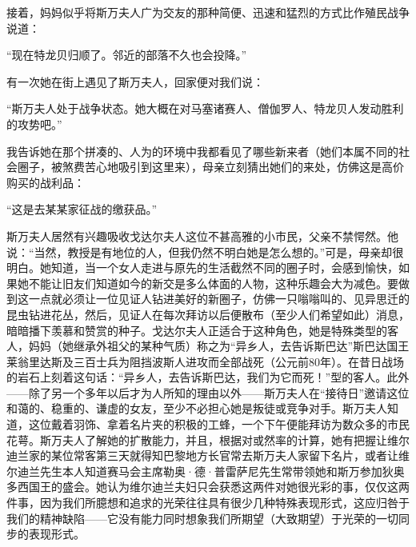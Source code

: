 \par 接着，妈妈似乎将斯万夫人广为交友的那种简便、迅速和猛烈的方式比作殖民战争说道：
\par “现在特龙贝归顺了。邻近的部落不久也会投降。”
\par 有一次她在街上遇见了斯万夫人，回家便对我们说：
\par “斯万夫人处于战争状态。她大概在对马塞诸赛人、僧伽罗人、特龙贝人发动胜利的攻势吧。”
\par 我告诉她在那个拼凑的、人为的环境中我都看见了哪些新来者（她们本属不同的社会圈子，被煞费苦心地吸引到这里来），母亲立刻猜出她们的来处，仿佛这是高价购买的战利品：
\par “这是去某某家征战的缴获品。”
\par 斯万夫人居然有兴趣吸收戈达尔夫人这位不甚高雅的小市民，父亲不禁愕然。他说：“当然，教授是有地位的人，但我仍然不明白她是怎么想的。”可是，母亲却很明白。她知道，当一个女人走进与原先的生活截然不同的圈子时，会感到愉快，如果她不能让旧友们知道如今的新交是多么体面的人物，这种乐趣会大为减色。要做到这一点就必须让一位见证人钻进美好的新圈子，仿佛一只嗡嗡叫的、见异思迁的昆虫钻进花丛，然后，见证人在每次拜访以后便散布（至少人们希望如此）消息，暗暗播下羡慕和赞赏的种子。戈达尔夫人正适合于这种角色，她是特殊类型的客人，妈妈（她继承外祖父的某种气质）称之为“异乡人，去告诉斯巴达”斯巴达国王莱翁里达斯及三百士兵为阻挡波斯人进攻而全部战死（公元前80年）。在昔日战场的岩石上刻着这句话：“异乡人，去告诉斯巴达，我们为它而死！”型的客人。此外——除了另一个多年以后才为人所知的理由以外——斯万夫人在“接待日”邀请这位和蔼的、稳重的、谦虚的女友，至少不必担心她是叛徒或竞争对手。斯万夫人知道，这位戴着羽饰、拿着名片夹的积极的工蜂，一个下午便能拜访为数众多的市民花萼。斯万夫人了解她的扩散能力，并且，根据对或然率的计算，她有把握让维尔迪兰家的某位常客第三天就得知巴黎地方长官常去斯万夫人家留下名片，或者让维尔迪兰先生本人知道赛马会主席勒奥·德·普雷萨尼先生常带领她和斯万参加狄奥多西国王的盛会。她认为维尔迪兰夫妇只会获悉这两件对她很光彩的事，仅仅这两件事，因为我们所臆想和追求的光荣往往具有很少几种特殊表现形式，这应归咎于我们的精神缺陷——它没有能力同时想象我们所期望（大致期望）于光荣的一切同步的表现形式。
